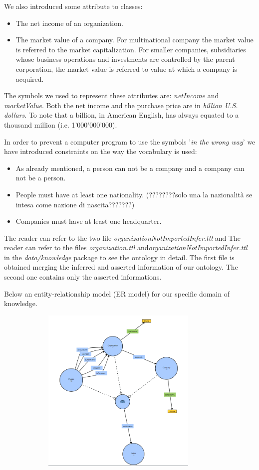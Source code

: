 We also introduced some attribute to classes:
\begin{itemize}
\item The net income of an organization.
\item The market value of a company. For multinational company the market value is referred to the market capitalization. For smaller companies, subsidiaries whose business operations and investments are controlled by the parent corporation, the market value is referred to value at which a company is acquired.
\end{itemize}
The symbols we used to represent these attributes are: \textit{ netIncome} and \textit{marketValue}.
Both the net income and the purchase price are in \textit{billion U.S. dollars}. To note that a billion, in American English, has always equated to a thousand million (i.e. 1'000'000'000).

In order to prevent a computer program to use the symbols '\textit{in the wrong way}' we have introduced  constraints on the way the vocabulary is used:
\begin{itemize}
\item As already mentioned, a person can not be a company and a company can not be a person.
\item People must have at least one nationality. (????????solo una la nazionalità se intesa come nazione di nascita???????)
\item Companies must have at least one headquarter. 
\end{itemize}

The reader can refer to the two file \textit{organizationNotImportedInfer.ttl} and \text
The reader can refer to the files \textit{organization.ttl} and\textit{organizationNotImportedInfer.ttl} in the \textit{data/knowledge} package to see the ontology in detail. The first file is obtained merging the inferred and asserted information of our ontology. The second one contains only the asserted informations.  

Below an entity-relationship model (ER model) for our specific domain of knowledge.
\begin{figure}
\centering
\includegraphics[width=10cm, height=8cm]{ERDiagram.png}
\end{figure}

